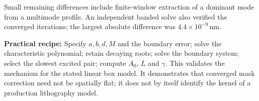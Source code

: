 \documentclass[10pt,a4paper]{article}
\newcommand{\smallnote}[1]{%
  {\small #1\par}}
\begin{document}
\smallnote{
Small remaining differences include finite-window
extraction of a dominant mode from a multimode
profile.
An independent banded solve also verified
the converged iterations;
the largest absolute difference was
$4.4\times10^{-9}\,\mathrm{nm}$.
}

\smallnote{
\textbf{Practical recipe:}
Specify $a,b,d,M$ and the boundary error;
solve the characteristic polynomial;
retain decaying roots;
solve the boundary system;
select the slowest excited pair;
compute $A_0$, $L$ and $\gamma$.
This validates the mechanism for the stated
linear box model.
It demonstrates that converged mask correction
need not be spatially flat;
it does not by itself identify the kernel of
a production lithography model.
}
\end{document}
